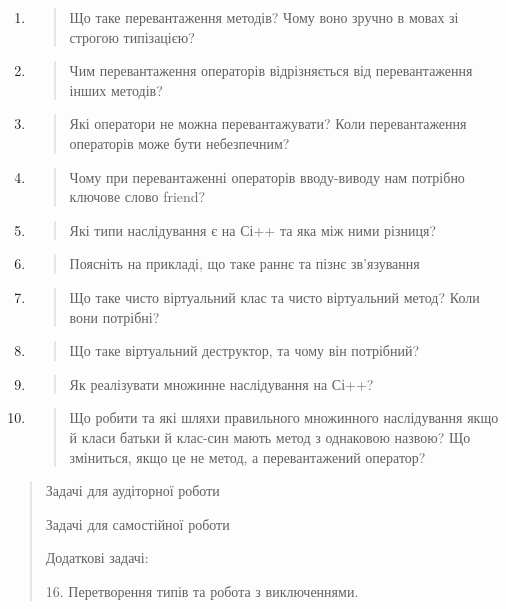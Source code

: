 \documentclass[]{article}
\begin{document}
\begin{enumerate}
\def\labelenumi{\arabic{enumi})}
\item
  \begin{quote}
  Що таке перевантаження методів? Чому воно зручно в мовах зі строгою
  типізацією?
  \end{quote}
\item
  \begin{quote}
  Чим перевантаження операторів відрізняється від перевантаження інших
  методів?
  \end{quote}
\item
  \begin{quote}
  Які оператори не можна перевантажувати? Коли перевантаження операторів
  може бути небезпечним?
  \end{quote}
\item
  \begin{quote}
  Чому при перевантаженні операторів вводу-виводу нам потрібно ключове
  слово friend?
  \end{quote}
\item
  \begin{quote}
  Які типи наслідування є на Сі++ та яка між ними різниця?
  \end{quote}
\item
  \begin{quote}
  Поясніть на прикладі, що таке раннє та пізнє зв'язування
  \end{quote}
\item
  \begin{quote}
  Що таке чисто віртуальний клас та чисто віртуальний метод? Коли вони
  потрібні?
  \end{quote}
\item
  \begin{quote}
  Що таке віртуальний деструктор, та чому він потрібний?
  \end{quote}
\item
  \begin{quote}
  Як реалізувати множинне наслідування на Сі++?
  \end{quote}
\item
  \begin{quote}
  Що робити та які шляхи правильного множинного наслідування якщо й
  класи батьки й клас-син мають метод з однаковою назвою? Що зміниться,
  якщо це не метод, а перевантажений оператор?
  \end{quote}
\end{enumerate}

\begin{quote}
Задачі для аудіторної роботи

Задачі для самостійної роботи

Додаткові задачі:

16. Перетворення типів та робота з виключеннями.
\end{quote}
\end{document}
